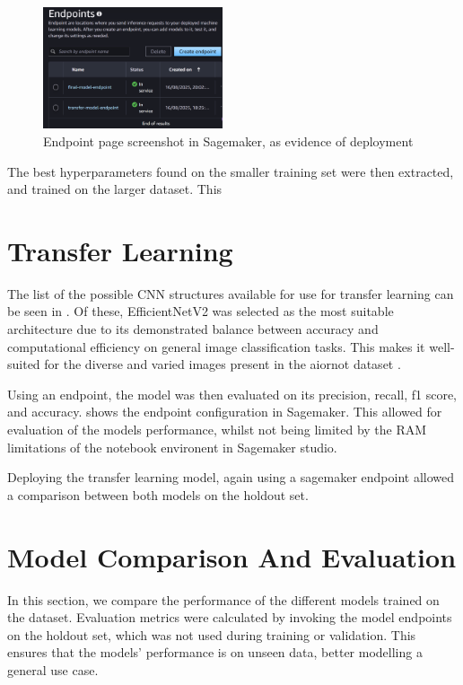 \begin{figure}[h]
    \centering
    \includegraphics[width=200px]{figures/endpoints_screenshot.png} %
    \centering
    \caption{Endpoint page screenshot in Sagemaker, as evidence of deployment} %
    \label{fig:endpoint} %
\end{figure}

The best hyperparameters found on the smaller training set were then extracted, and trained on the larger dataset. This 

\section{Transfer Learning}

The list of the possible CNN structures available for use for transfer learning can be seen in \cite{keras_applications}. Of these, EfficientNetV2 was selected as the most suitable architecture due to its demonstrated balance between accuracy and computational efficiency on general image classification tasks. This makes it well-suited for the diverse and varied images present in the aiornot dataset \cite{keras_applications, tan2021efficientnetv2}.

Using an endpoint, the model was then evaluated on its precision, recall, f1 score, and accuracy.  shows the endpoint configuration in Sagemaker. This allowed for evaluation of the models performance, whilst not being limited by the RAM limitations of the notebook environent in Sagemaker studio. 

Deploying the transfer learning model, again using a sagemaker endpoint allowed a comparison between both models on the holdout set.

\section{Model Comparison And Evaluation}

In this section, we compare the performance of the different models trained on the dataset. Evaluation metrics were calculated by invoking the model endpoints on the holdout set, which was not used during training or validation. This ensures that the models' performance is on unseen data, better modelling a general use case.


